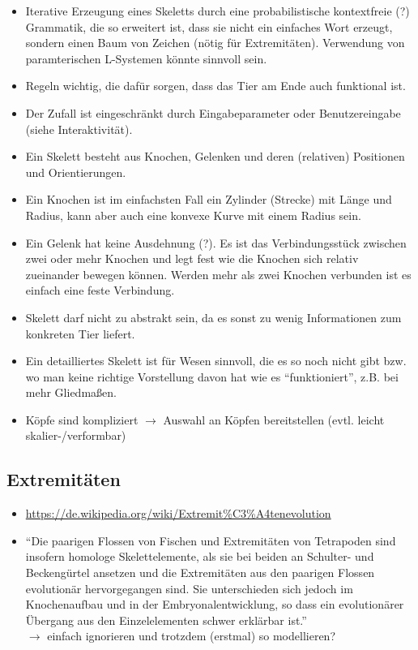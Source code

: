 \begin{itemize}
 \item Iterative Erzeugung eines Skeletts durch eine probabilistische kontextfreie (?) Grammatik, die so erweitert ist, dass sie nicht ein einfaches Wort erzeugt, sondern einen Baum von Zeichen (nötig für Extremitäten). Verwendung von paramterischen L-Systemen \cite{Paramteric_L-Systems} könnte sinnvoll sein.
 \item Regeln wichtig, die dafür sorgen, dass das Tier am Ende auch funktional ist.
 \item Der Zufall ist eingeschränkt durch Eingabeparameter oder Benutzereingabe (siehe Interaktivität).
 \item Ein Skelett besteht aus Knochen, Gelenken und deren (relativen) Positionen und Orientierungen.
 \item Ein Knochen ist im einfachsten Fall ein Zylinder (Strecke) mit Länge und Radius, kann aber auch eine konvexe Kurve mit einem Radius sein.
 \item Ein Gelenk hat keine Ausdehnung (?). Es ist das Verbindungsstück zwischen zwei oder mehr Knochen und legt fest wie die Knochen sich relativ zueinander bewegen können. Werden mehr als zwei Knochen verbunden ist es einfach eine feste Verbindung.
 \item Skelett darf nicht zu abstrakt sein, da es sonst zu wenig Informationen zum konkreten Tier liefert.
 \item Ein detailliertes Skelett ist für Wesen sinnvoll, die es so noch nicht gibt bzw. wo man keine richtige Vorstellung davon hat wie es "`funktioniert"', z.B. bei mehr Gliedmaßen.
 \item Köpfe sind kompliziert $\rightarrow$ Auswahl an Köpfen bereitstellen (evtl. leicht skalier-/verformbar)
\end{itemize}

\subsection{Extremitäten}

\begin{itemize}
 \item \url{https://de.wikipedia.org/wiki/Extremit\%C3\%A4tenevolution}
 \item "`Die paarigen Flossen von Fischen und Extremitäten von Tetrapoden sind insofern homologe Skelettelemente, als sie bei beiden an Schulter- und Beckengürtel ansetzen und die Extremitäten aus den paarigen Flossen evolutionär hervorgegangen sind.\cite{homology} Sie unterschieden sich jedoch im Knochenaufbau und in der Embryonalentwicklung, so dass ein evolutionärer Übergang aus den Einzelelementen schwer erklärbar ist."'\\
 $\rightarrow$ einfach ignorieren und trotzdem (erstmal) so modellieren?
\end{itemize}


